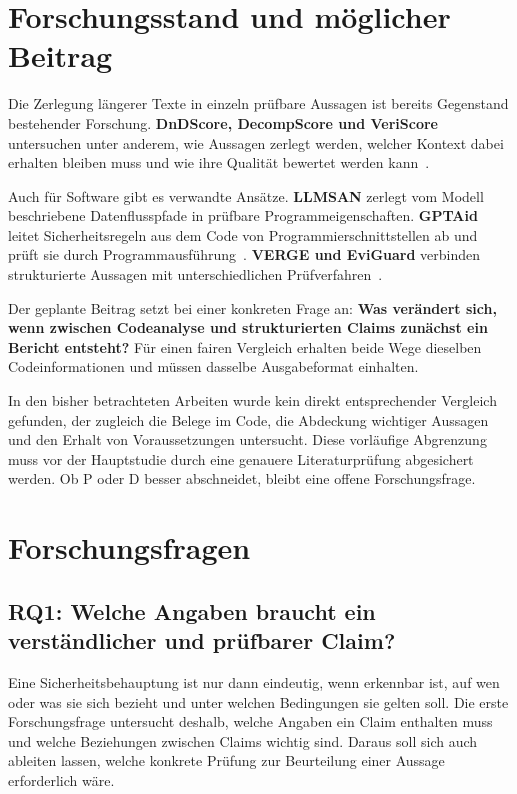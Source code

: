 \documentclass[10pt,a4paper]{article}
\begin{document}
\section{Forschungsstand und möglicher Beitrag}
Die Zerlegung längerer Texte in einzeln prüfbare Aussagen ist bereits Gegenstand bestehender Forschung. \textbf{DnDScore, DecompScore und VeriScore} untersuchen unter anderem, wie Aussagen zerlegt werden, welcher Kontext dabei erhalten bleiben muss und wie ihre Qualität bewertet werden kann~\cite{dnd,decomp,veriscore}.

Auch für Software gibt es verwandte Ansätze. \textbf{LLMSAN} zerlegt vom Modell beschriebene Datenflusspfade in prüfbare Programmeigenschaften. \textbf{GPTAid} leitet Sicherheitsregeln aus dem Code von Programmierschnittstellen ab und prüft sie durch Programmausführung~\cite{llmsan,gptaid}. \textbf{VERGE und EviGuard} verbinden strukturierte Aussagen mit unterschiedlichen Prüfverfahren~\cite{verge,eviguard}.

Der geplante Beitrag setzt bei einer konkreten Frage an: \textbf{Was verändert sich, wenn zwischen Codeanalyse und strukturierten Claims zunächst ein Bericht entsteht?} Für einen fairen Vergleich erhalten beide Wege dieselben Codeinformationen und müssen dasselbe Ausgabeformat einhalten.

In den bisher betrachteten Arbeiten wurde kein direkt entsprechender Vergleich gefunden, der zugleich die Belege im Code, die Abdeckung wichtiger Aussagen und den Erhalt von Voraussetzungen untersucht. Diese vorläufige Abgrenzung muss vor der Hauptstudie durch eine genauere Literaturprüfung abgesichert werden. Ob P oder D besser abschneidet, bleibt eine offene Forschungsfrage.

\newpage
\section{Forschungsfragen}
\subsection{RQ1: Welche Angaben braucht ein verständlicher und prüfbarer Claim?}
Eine Sicherheitsbehauptung ist nur dann eindeutig, wenn erkennbar ist, auf wen oder was sie sich bezieht und unter welchen Bedingungen sie gelten soll. Die erste Forschungsfrage untersucht deshalb, welche Angaben ein Claim enthalten muss und welche Beziehungen zwischen Claims wichtig sind. Daraus soll sich auch ableiten lassen, welche konkrete Prüfung zur Beurteilung einer Aussage erforderlich wäre.
\end{document}
